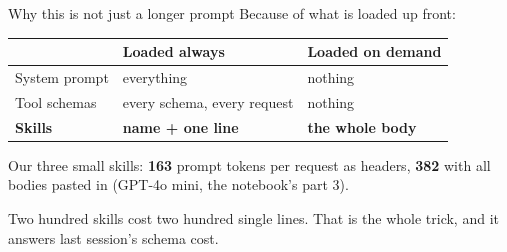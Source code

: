 \documentclass[aspectratio=169]{beamer}
\newcommand{\keybox}[1]{%
  \begin{tcolorbox}[colback=armblue!8, colframe=armblue, boxrule=0.6pt, arc=2pt]
  #1
  \end{tcolorbox}}
\begin{document}
\begin{frame}{Why this is not just a longer prompt}
  \vspace{0.35em}
  Because of what is loaded up front:

  \vspace{0.4em}
  \begin{center}
  \small
  \begin{tabular}{lll}
    \toprule
    & \textbf{Loaded always} & \textbf{Loaded on demand} \\
    \midrule
    System prompt & everything & nothing \\
    Tool schemas  & every schema, every request & nothing \\
    \textbf{Skills} & \textbf{name + one line} & \textbf{the whole body} \\
    \bottomrule
  \end{tabular}
  \end{center}

  \vspace{0.3em}
  {\small Our three small skills: \textbf{163} prompt tokens per request as headers, \textbf{382} with all
  bodies pasted in (GPT-4o mini, the notebook's part 3).}

  \vspace{0.3em}
  \keybox{\small Two hundred skills cost two hundred single lines. That is the whole trick, and it answers last
  session's schema cost.}
\end{frame}
\end{document}
